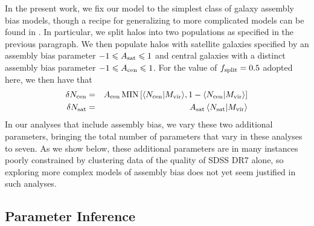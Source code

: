 \documentclass[usenatbib,usegraphicx,letterpaper]{mn2e}
\newcommand{\mvir}{M_{\rm vir}}
\begin{document}
In the present work, we fix our model to the simplest class of galaxy
assembly bias models, though a recipe for generalizing to more
complicated models can be found in \citet{hearin_etal16}. In
particular, we split halos into two populations as specified in the
previous paragraph. We then populate halos with satellite galaxies
specified by an assembly bias parameter $-1 \le A_{\rm sat} \le 1$ and
central galaxies with a distinct assembly bias parameter
$-1 \le A_{\rm cen} \le 1$. For the value of $f_{\rm split}=0.5$ adopted here,
we then have that
%
\begin{eqnarray}
%
\delta N_{\rm cen} & = & A_{\rm cen} \, {\rm MIN} \left[ \langle N_{\mathrm{cen}} \vert \mvir \rangle ,
1- \langle N_{\mathrm{cen}} \vert \mvir \rangle \right]  \nonumber \\ 
\delta N_{\rm sat} & = & A_{\rm sat} \, \langle N_{\mathrm{sat}} \vert \mvir \rangle
\end{eqnarray}
%
In our analyses that include assembly bias, we vary these two
additional parameters, bringing the total number of parameters
that vary in these analyses to seven. As we show below, these additional
parameters are in many instances poorly constrained by clustering data
of the quality of SDSS DR7 alone, so exploring more complex models of
assembly bias does not yet seem justified in such analyses.


\subsection{Parameter Inference}
\label{subsection:mcmc}
\end{document}
